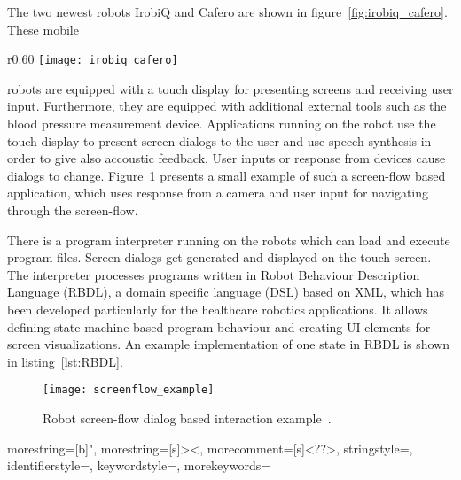 The two newest robots IrobiQ and Cafero are shown in figure~\ref{fig:irobiq_cafero}.
These mobile 
\begin{wrapfigure}{r}{0.60\textwidth}
  \centering
  \texttt{[image: irobiq\_cafero]}
  \caption{IrobiQ and Cafero, two robots of the healtcare project.}
  \label{fig:irobiq_cafero}
\end{wrapfigure}
robots are equipped with a touch display for presenting screens and receiving user input. Furthermore, they are equipped with additional external tools such as the blood pressure measurement device.
Applications running on the robot use the touch display to present screen dialogs to the user and use speech synthesis in order to give also accoustic feedback. User inputs or response from devices cause dialogs to change. Figure~\ref{fig:screenflow_example} presents a small example of such a screen-flow based application, which uses response from a camera and user input for navigating through the screen-flow.


There is a program interpreter running on the robots which can load and execute program files. Screen dialogs get generated and displayed on the touch screen.
The interpreter processes programs written in Robot Behaviour Description Language (RBDL), a domain specific language (DSL) based on XML, which has been developed particularly for the healthcare robotics applications. It allows defining state machine based program behaviour and creating UI elements for screen visualizations. An example implementation of one state in RBDL is shown in listing~\ref{lst:RBDL}.

\begin{figure}[htbp]
  \centering
  \texttt{[image: screenflow\_example]} 
  \caption{Robot screen-flow dialog based interaction example~\cite{robostudio}.}
  \label{fig:screenflow_example}
\end{figure}


{
  morestring=[b]",
  morestring=[s]{>}{<},
  morecomment=[s]{<?}{?>},
  stringstyle=\color{black},
  identifierstyle=\color{darkblue},
  keywordstyle=\color{cyan},
	morekeywords={%
	}
}

